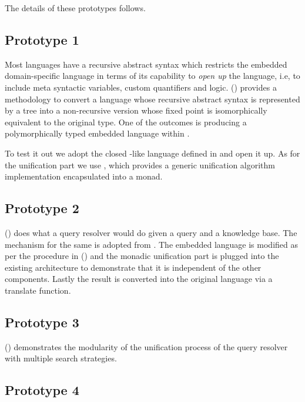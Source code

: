 \documentclass[thesis-solanki.tex]{subfiles}
\begin{document}
The details of these prototypes follows.

\subsection{Prototype 1}

Most languages have a recursive abstract syntax which restricts the embedded domain-specific language
 in terms of its capability to \textit{open up} the language, i.e, to
include meta syntactic variables, custom quantifiers and logic.
() provides a methodology to convert a language whose recursive abstract
syntax is represented by a tree into a non-recursive version whose fixed point is isomorphically equivalent to the
original type.
One of the outcomes is producing a polymorphically typed embedded language within .

To test it out we adopt the closed -like language defined in \cite{prolog-lib} and open it up.
As for the unification part we use \cite{unification-fd-lib}, which provides a generic unification algorithm
implementation encapsulated into a monad.


\subsection{Prototype 2}

() does what a  query resolver would do given a query
and a knowledge base.
The mechanism for the same is adopted from \cite{prolog-lib}.
The embedded language is modified as per the procedure in () and the monadic
unification part is plugged into the existing architecture to demonstrate that it is independent of the other
components.
Lastly the result is converted into the original language via a translate function.

\subsection{Prototype 3}

() demonstrates the modularity of the unification process of the query
resolver with multiple search strategies.

\subsection{Prototype 4}
\end{document}
